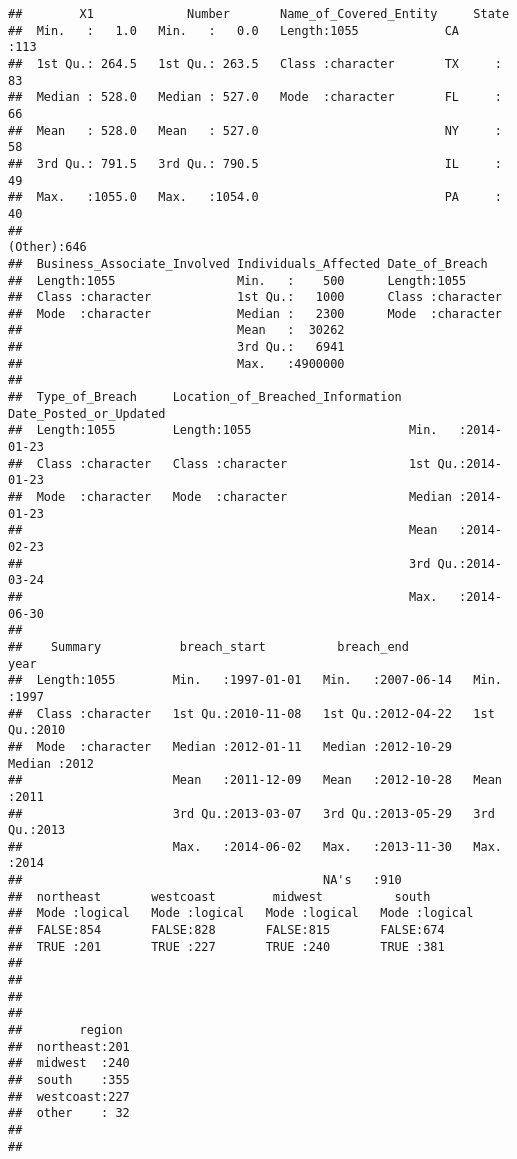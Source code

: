 \documentclass[
]{article}
\begin{document}
\begin{verbatim}
##        X1             Number       Name_of_Covered_Entity     State    
##  Min.   :   1.0   Min.   :   0.0   Length:1055            CA     :113  
##  1st Qu.: 264.5   1st Qu.: 263.5   Class :character       TX     : 83  
##  Median : 528.0   Median : 527.0   Mode  :character       FL     : 66  
##  Mean   : 528.0   Mean   : 527.0                          NY     : 58  
##  3rd Qu.: 791.5   3rd Qu.: 790.5                          IL     : 49  
##  Max.   :1055.0   Max.   :1054.0                          PA     : 40  
##                                                           (Other):646  
##  Business_Associate_Involved Individuals_Affected Date_of_Breach    
##  Length:1055                 Min.   :    500      Length:1055       
##  Class :character            1st Qu.:   1000      Class :character  
##  Mode  :character            Median :   2300      Mode  :character  
##                              Mean   :  30262                        
##                              3rd Qu.:   6941                        
##                              Max.   :4900000                        
##                                                                     
##  Type_of_Breach     Location_of_Breached_Information Date_Posted_or_Updated
##  Length:1055        Length:1055                      Min.   :2014-01-23    
##  Class :character   Class :character                 1st Qu.:2014-01-23    
##  Mode  :character   Mode  :character                 Median :2014-01-23    
##                                                      Mean   :2014-02-23    
##                                                      3rd Qu.:2014-03-24    
##                                                      Max.   :2014-06-30    
##                                                                            
##    Summary           breach_start          breach_end              year     
##  Length:1055        Min.   :1997-01-01   Min.   :2007-06-14   Min.   :1997  
##  Class :character   1st Qu.:2010-11-08   1st Qu.:2012-04-22   1st Qu.:2010  
##  Mode  :character   Median :2012-01-11   Median :2012-10-29   Median :2012  
##                     Mean   :2011-12-09   Mean   :2012-10-28   Mean   :2011  
##                     3rd Qu.:2013-03-07   3rd Qu.:2013-05-29   3rd Qu.:2013  
##                     Max.   :2014-06-02   Max.   :2013-11-30   Max.   :2014  
##                                          NA's   :910                        
##  northeast       westcoast        midwest          south        
##  Mode :logical   Mode :logical   Mode :logical   Mode :logical  
##  FALSE:854       FALSE:828       FALSE:815       FALSE:674      
##  TRUE :201       TRUE :227       TRUE :240       TRUE :381      
##                                                                 
##                                                                 
##                                                                 
##                                                                 
##        region   
##  northeast:201  
##  midwest  :240  
##  south    :355  
##  westcoast:227  
##  other    : 32  
##                 
## 
\end{verbatim}
\end{document}
